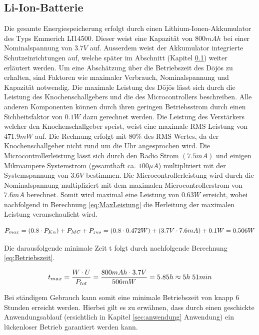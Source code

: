 \subsection{Li-Ion-Batterie}\label{sec:energiespeicher}

Die gesamte Energiespeicherung erfolgt durch einen Lithium-Ionen-Akkumulator des Typs Emmerich LI14500. Dieser weist eine Kapazität von $800mAh$ bei einer Nominalspannung von $3.7V$ auf. Ausserdem weist der Akkumulator integrierte Schutzeinrichtungen auf, welche später im Abschnitt  (Kapitel \ref{sec:energiespeicher}) weiter erläutert werden. Um eine Abschätzung über die Betriebszeit des Dōjōs zu erhalten, sind Faktoren wie maximaler Verbrauch, Nominalspannung und Kapazität notwendig. Die maximale Leistung des Dōjōs lässt sich durch die Leistung des Knochenschallgebers und die des Microcontrollers beschreiben. Alle anderen Komponenten können durch ihren geringen Betriebsstrom durch einen Sichheitsfaktor von $0.1W$ dazu gerechnet werden. Die Leistung des Verstärkers welcher den Knochenschallgeber speist, weist eine maximale RMS Leistung von $471.9mW$ auf. Die Rechnung erfolgt mit $80\%$ des RMS Wertes, da der Knochenschallgeber nicht rund um die Uhr angesprochen wird. Die Microcontrollerleistung lässt sich durch den Radio Strom $(7.5mA)$ und einigen Mikroampere Systemstrom (gesamthaft ca. $100 \mu A$) multipliziert mit der Systemspannung von $3.6V$ bestimmen. Die Microcontrollerleistung wird durch die Nominalspannung multipliziert mit dem maximalen Microcontrollerstrom von $7.6mA$ berechnet. Somit wird maximal eine Leistung von $0.63W$ erreicht, wobei nachfolgend in Berechnung \ref{eq:MaxLeistung} die Herleitung der maximalen Leistung veranschaulicht wird.

\begin{equation}
\centering
P_{max}=\left(0.8\cdot P_{Kn}\right)+P_{MC}+P_{zus}=(0.8\cdot 0.472W)+(3.7V \cdot 7.6mA)+0.1W=0.506W
\label{eq:MaxLeistung}
\end{equation}

Die darausfolgende minimale Zeit t folgt durch nachfolgende Berechnung \ref{eq:Betriebszeit}.

\begin{equation}
\centering
t_{max}=\frac{W\cdot U}{P_{tot}}=\frac{800mAh \cdot 3.7V}{506mW}=5.85h\approx 5h \thickspace 51min
\label{eq:Betriebszeit}
\end{equation}

Bei ständigem Gebrauch kann somit eine minimale Betriebszeit von knapp 6 Stunden erreicht werden. Hierbei gilt es zu erwähnen, dass durch einen geschickte Anwendungsablauf (ersichtlich in Kapitel \ref{sec:anwendung} Anwendung) ein lückenloser Betrieb garantiert werden kann.


